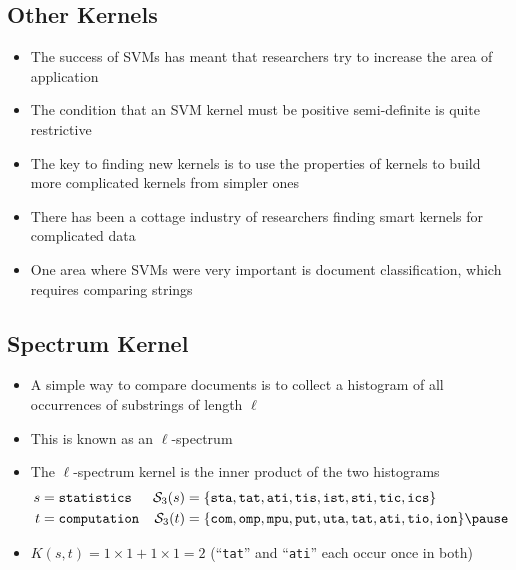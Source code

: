 \begin{slide}
\section{Other Kernels}

\begin{PauseHighLight}
  \begin{itemize}
  \item The success of SVMs has meant that researchers try to increase
    the area of application\pause
  \item The condition that an SVM kernel must be positive semi-definite
    is quite restrictive\pause
  \item The key to finding new kernels is to use the properties of
    kernels to build more complicated kernels from simpler ones\pause
  \item There has been a cottage industry of researchers finding smart
    kernels for complicated data\pause
  \item One area where SVMs were very important is document
    classification, which requires comparing strings\pause
  \end{itemize}
\end{PauseHighLight}

\end{slide}

\begin{slide}
\section[-1]{Spectrum Kernel}

\begin{PauseHighLight}
  \begin{itemize}
  \item A simple way to compare documents is to collect a histogram of
    all occurrences of substrings of length $\ell$\pause
  \item This is known as an $\ell$-spectrum\pause
  \item The $\ell$-spectrum kernel is the inner product of the two
    histograms
    {\small
    \begin{align*}
      s &= \mbox{\tt statistics} & \mathcal{S}_3(s) &= \{\mathtt{sta, tat, ati, tis,
      ist, sti, tic, ics}\}
      \\
      t &= \mbox{\tt computation} & \mathcal{S}_3(t) &= \{\mathtt{com, omp,
      mpu, put, uta, tat, ati, tio, ion}\}\pause
    \end{align*}}
  \item $K(s,t) = 1\times1+1\times1 = 2$ (``\texttt{tat}'' and
    ``\texttt{ati}'' each occur once in both)\pause
  \end{itemize}
\end{PauseHighLight}

\end{slide}

